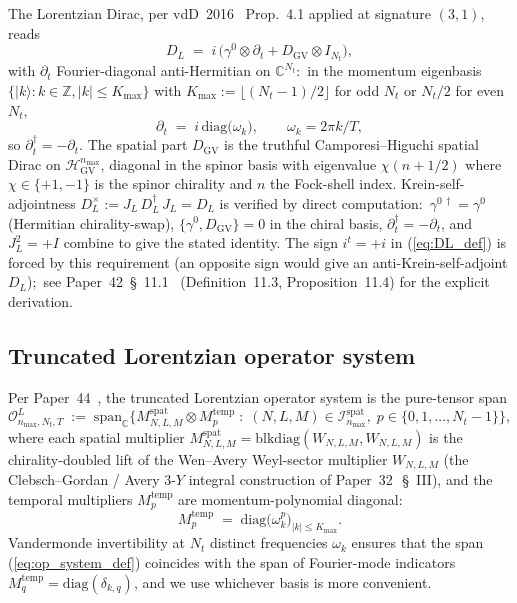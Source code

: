 \documentclass[11pt,a4paper]{article}
\theoremstyle{plain}
\theoremstyle{definition}
\newcommand{\nmax}{n_{\max}}
\newcommand{\Nt}{N_{t}}
\newcommand{\Kmax}{K_{\max}}
\newcommand{\Op}{\mathcal{O}}
\newcommand{\C}{\mathbb{C}}
\newcommand{\Z}{\mathbb{Z}}
\newcommand{\DGV}{D_{\mathrm{GV}}}
\newcommand{\DL}{D_{L}}
\newcommand{\JL}{J_{L}}
\newcommand{\HGV}{\mathcal{H}_{\mathrm{GV}}}
\newcommand{\spat}{\mathrm{spat}}
\newcommand{\temp}{\mathrm{temp}}
\begin{document}
The Lorentzian Dirac, per vdD~2016~\cite{vandungen2016} Prop.~4.1
applied at signature $(3, 1)$, reads
\begin{equation}\label{eq:DL_def}
   \DL \;=\; i\,\bigl(\gamma^{0} \otimes \partial_{t}
                       + \DGV \otimes I_{\Nt}\bigr),
\end{equation}
with $\partial_{t}$ Fourier-diagonal anti-Hermitian on $\C^{\Nt}$:\
in the momentum eigenbasis $\{|k\rangle : k \in \Z, |k| \le \Kmax\}$
with $\Kmax := \lfloor(\Nt - 1)/2\rfloor$ for odd $\Nt$ or $\Nt/2$ for
even $\Nt$,
\begin{equation}\label{eq:partial_t_def}
   \partial_{t} \;=\; i\,\mathrm{diag}\bigl(\omega_{k}\bigr),
   \qquad \omega_{k} = 2\pi k / T,
\end{equation}
so $\partial_{t}^{\dagger} = -\partial_{t}$. The spatial part $\DGV$ is
the truthful Camporesi--Higuchi spatial Dirac on $\HGV^{\nmax}$,
diagonal in the spinor basis with eigenvalue $\chi(n + 1/2)$ where
$\chi \in \{+1, -1\}$ is the spinor chirality and $n$ the Fock-shell
index. Krein-self-adjointness $\DL^{\times} := \JL\,\DL^{\dagger}\,\JL
= \DL$ is verified by direct computation:\ $\gamma^{0\,\dagger} =
\gamma^{0}$ (Hermitian chirality-swap), $\{\gamma^{0}, \DGV\} = 0$ in
the chiral basis, $\partial_{t}^{\dagger} = -\partial_{t}$, and
$\JL^{2} = +I$ combine to give the stated identity. The sign $i^{t} =
+i$ in (\ref{eq:DL_def}) is forced by this requirement (an opposite
sign would give an anti-Krein-self-adjoint $\DL$);\ see
Paper~42~\S~11.1~\cite{paper42} (Definition~11.3, Proposition~11.4) for
the explicit derivation.

\subsection{Truncated Lorentzian operator system}\label{sec:op_system}

Per Paper~44~\cite{paper44}, the truncated Lorentzian operator system
is the pure-tensor span
\begin{equation}\label{eq:op_system_def}
   \Op^{L}_{\nmax,\Nt,T}
   \;:=\; \mathrm{span}_{\C}\bigl\{
            M^{\spat}_{N,L,M} \otimes M^{\temp}_{p}
            \;:\; (N, L, M) \in \mathcal{I}^{\spat}_{\nmax},\;
                  p \in \{0, 1, \ldots, \Nt - 1\}
         \bigr\},
\end{equation}
where each spatial multiplier
$M^{\spat}_{N,L,M} = \mathrm{blkdiag}(W_{N,L,M}, W_{N,L,M})$ is the
chirality-doubled lift of the Wen--Avery Weyl-sector
multiplier $W_{N,L,M}$ (the Clebsch--Gordan / Avery 3-$Y$ integral
construction of Paper~32~\cite{paper32}\,\S~III), and the temporal
multipliers $M^{\temp}_{p}$ are momentum-polynomial diagonal:
\begin{equation}\label{eq:temp_multipliers}
   M^{\temp}_{p} \;=\; \mathrm{diag}\bigl(\omega_{k}^{p}\bigr)_{|k| \le \Kmax}.
\end{equation}
Vandermonde invertibility at $\Nt$ distinct frequencies $\omega_{k}$
ensures that the span (\ref{eq:op_system_def}) coincides with the
span of Fourier-mode indicators $M^{\temp}_{q} =
\mathrm{diag}(\delta_{k,q})$, and we use whichever basis is more
convenient.
\end{document}
